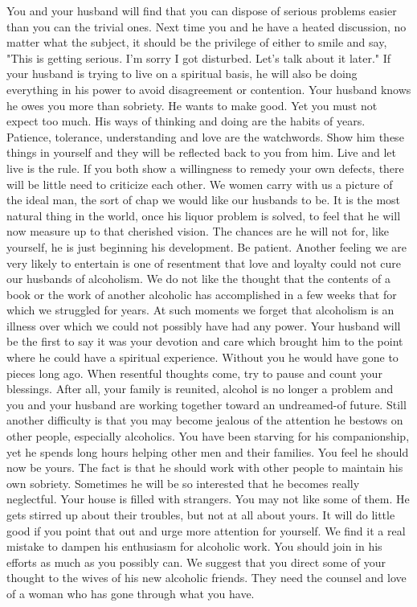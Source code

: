 \begin{biblechapter}
You and your husband will find that you can dispose of serious problems easier than you can the trivial ones.  Next time you and he have a heated discussion, no matter what the subject, it should be the privilege of either to smile and say, "This is getting serious.  I'm sorry I got disturbed.  Let's talk about it later."  If your husband is trying to live on a spiritual basis, he will also be doing everything in his power to avoid disagreement or contention.
Your husband knows he owes you more than sobriety.  He wants to make good.  Yet you must not expect too much.  His ways of thinking and doing are the habits of years.  Patience, tolerance, understanding and love are the watchwords.  Show him these things in yourself and they will be reflected back to you from him.  Live and let live is the rule.  If you both show a willingness to remedy your own defects, there will be little need to criticize each other.
We women carry with us a picture of the ideal man, the sort of chap we would like our husbands to be.  It is the most natural thing in the world, once his liquor problem is solved, to feel that he will now measure up to that cherished vision.  The chances are he will not for, like yourself, he is just beginning his development.  Be patient.
Another feeling we are very likely to entertain is one of resentment that love and loyalty could not cure our husbands of alcoholism.  We do not like the thought that the contents of a book or the work of another alcoholic has accomplished in a few weeks that for which we struggled for years.  At such moments we forget that alcoholism is an illness over which we could not possibly have had any power.  Your husband will be the first to say it was your devotion and care which brought him to the point where he could have a spiritual experience.  Without you he would have gone to pieces long ago.  When resentful thoughts come, try to pause and count your blessings.  After all, your family is reunited, alcohol is no longer a problem and you and your husband are working together toward an undreamed-of future.
Still another difficulty is that you may become jealous of the attention he bestows on other people, especially alcoholics.  You have been starving for his companionship, yet he spends long hours helping other men and their families.  You feel he should now be yours.  The fact is that he should work with other people to maintain his own sobriety.  Sometimes he will be so interested that he becomes really neglectful.  Your house is filled with strangers.  You may not like some of them.  He gets stirred up about their troubles, but not at all about yours.  It will do little good if you point that out and urge more attention for yourself.  We find it a real mistake to dampen his enthusiasm for alcoholic work.  You should join in his efforts as much as you possibly can.  We suggest that you direct some of your thought to the wives of his new alcoholic friends.  They need the counsel and love of a woman who has gone through what you have.

\end{biblechapter}
